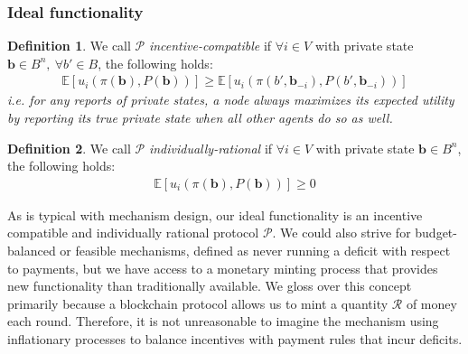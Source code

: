 \documentclass{article}
\theoremstyle{definition}
\newtheorem{definition}{Definition}[section]
\theoremstyle{definition}
\newcounter{protocol}
\begin{document}
\subsubsection{Ideal functionality}
\begin{definition}
We call $\mathcal{P}$ \textit{incentive-compatible} if $\forall i\in V$ with private state $\textbf{b}\in B^n,~\forall b'\in B$, the following holds:
\begin{align*}
    \mathbb{E}[u_i(\pi(\textbf{b}), P(\textbf{b}))] \geq \mathbb{E}[u_i(\pi(b',\textbf{b}_{-i}), P(b', \textbf{b}_{-i}))]
\end{align*}
\textit{i.e. for any reports of private states, a node always maximizes its expected utility by reporting its true private state when all other agents do so as well.}
\end{definition}
\begin{definition}
We call $\mathcal{P}$ \textit{individually-rational} if $\forall i\in V$ with private state $\textbf{b}\in B^n$, the following holds:
\begin{align}
    \mathbb{E}[u_i(\pi(\textbf{b}), P(\textbf{b}))] \geq 0
\end{align}
\end{definition}

As is typical with mechanism design, our ideal functionality is an incentive compatible and individually rational protocol $\mathcal{P}$. We could also strive for budget-balanced or feasible mechanisms, defined as never running a deficit with respect to payments, but we have access to a monetary minting process that provides new functionality than traditionally available. We gloss over this concept primarily because a blockchain protocol allows us to mint a quantity $\mathcal{R}$ of money each round. Therefore, it is not unreasonable to imagine the mechanism using inflationary processes to balance incentives with payment rules that incur deficits.
\end{document}
